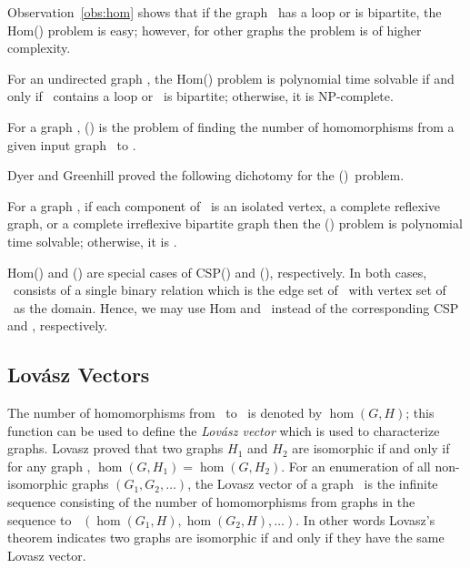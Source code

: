 Observation~\ref{obs:hom} shows that if the graph \mH\ has a loop or is bipartite,
the Hom(\mH) problem is easy; however, for other graphs the problem is of higher complexity.

\begin{theorem} 
For an undirected graph \mH, the Hom(\mH) problem is polynomial time solvable if and only
if \mH\ contains a loop or \mH\ is bipartite; otherwise, it is NP-complete.
\end{theorem}

\begin{defi}[\chom(\mH)]
For a graph \mH,
\chom(\mH) is the problem of finding the number of homomorphisms from a given 
input graph \mG\ to \mH.
\end{defi}

Dyer and Greenhill proved the following dichotomy for the \chom(\mH)\ problem.
\begin{theorem} 
For a graph \mH, if each component of \mH\ is an isolated vertex, a complete reflexive graph,
or a complete irreflexive bipartite graph then the \chom(\mH) problem 
is polynomial time solvable; otherwise, it is \cpc\@.
\end{theorem}

Hom(\mH) and \chom(\mH) are special cases of CSP(\mrelset) and \ccsp(\mrelset),
respectively. In both cases, \mrelset\ consists of a single binary relation which is the
edge set of \mH\ with vertex set of \mH\ as the domain.
Hence, we may use Hom and \chom\ instead of
the corresponding CSP and \ccsp, respectively. 

\subsection*{Lov\'{a}sz Vectors}
The number of homomorphisms from \mG\ to \mH\ is denoted by \(\hom(G,H)\); this function
can be used to define the \emph{Lov\'{a}sz vector} which is used to characterize graphs.
Lovasz \cite{lovasz} proved that
two graphs \(H_1\) and \(H_2\) are isomorphic if and only if for any graph \mG,
\(\hom(G,H_1)=\hom(G,H_2)\). 
For an enumeration of all non-isomorphic graphs \((G_1,G_2,\dotsc)\), 
the Lovasz vector of a graph \mH\ is the infinite sequence consisting of the number of
homomorphisms from graphs in the sequence to \mH\ 
\((\hom(G_1,H), \hom(G_2,H), \dotsc)\)\@. 
In other words Lovasz's theorem indicates two graphs are isomorphic if and only if
they have the same Lovasz vector.  

